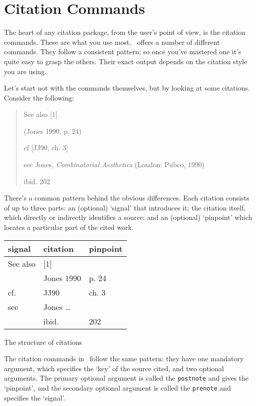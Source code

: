 \chapter{Citation Commands}\label{ch:citationcommands}

The heart of any citation package, from the user’s point of view, is
the citation commands. These are what you use most. \biblatex\ offers a
number of different commands. They follow a consistent pattern; so
once you’ve mastered one it’s quite easy to grasp the others. Their
exact output depends on the citation style you are using.

Let's start not with the commands themselves, but by looking at some
citations. Consider the following:

\begin{quote}
See also [1]

(Jones 1990, p. 24)

cf [JJ90, ch. 3]

see Jones, \emph{Combinatorial Aesthetics} (London: Pubco, 1990)

ibid. 202
\end{quote}

There's a common pattern behind the obvious differences. Each citation
consists of up to three parts: an (optional) `signal' that introduces
it; the citation itself, which directly or indirectly identifies a
source; and an (optional) `pinpoint' which locates a particular part
of the cited work.

\begin{margintable}
\begin{tabular}{lll}
\toprule
\textsf{signal} & \textsf{citation} & \textsf{pinpoint} \\
\midrule 
See also &   [1] \\
         &   Jones 1990   & p. 24 \\
cf.      &   JJ90         & ch. 3 \\
see      &   Jones \ldots\    \\ 
         &   ibid.        &  202 \\
\bottomrule
\end{tabular}
\caption{The structure of citations}
\end{margintable}

The citation commands in \biblatex\ follow the same pattern: they have
one mandatory argument, which specifies the `key' of the source cited,
and two optional arguments. The primary optional argument is called
the \texttt{postnote} and gives the `pinpoint', and the secondary optional
argument is called the \texttt{prenote} and specifies the `signal'.

